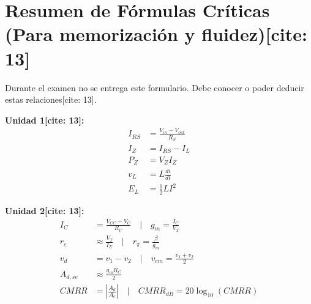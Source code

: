 \documentclass[11pt, a4paper]{article}
\begin{document}
\section*{Resumen de Fórmulas Críticas (Para memorización y fluidez)[cite: 13]}
Durante el examen no se entrega este formulario. Debe conocer o poder deducir estas relaciones[cite: 13].

\begin{minipage}[t]{0.45\textwidth}
    \textbf{Unidad 1[cite: 13]:}
    \begin{align*}
        I_{RS} &= \frac{V_{in} - V_{out}}{R_S} \\
        I_Z &= I_{RS} - I_L \\
        P_Z &= V_Z I_Z \\
        v_L &= L \frac{di}{dt} \\
        E_L &= \frac{1}{2} L I^2
    \end{align*}
\end{minipage}
\begin{minipage}[t]{0.5\textwidth}
    \textbf{Unidad 2[cite: 13]:}
    \begin{align*}
        I_C &= \frac{V_{CC} - V_C}{R_C} \quad \Big| \quad g_m = \frac{I_C}{V_T} \\
        r_e &\approx \frac{V_T}{I_E} \quad \Big| \quad r_\pi = \frac{\beta}{g_m} \\
        v_d &= v_1 - v_2 \quad \Big| \quad v_{cm} = \frac{v_1 + v_2}{2} \\
        A_{d,se} &\approx \frac{g_m R_C}{2} \\
        CMRR &= \left| \frac{A_d}{A_c} \right| \quad \Big| \quad CMRR_{dB} = 20\log_{10}(CMRR)
    \end{align*}
\end{minipage}
\end{document}
